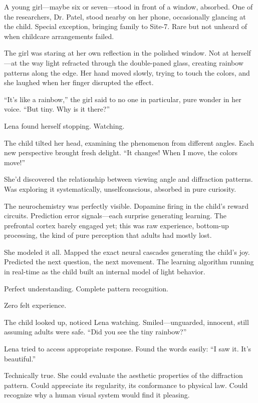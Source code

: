 A young girl—maybe six or seven—stood in front of a window, absorbed. One of the researchers, Dr. Patel, stood nearby on her phone, occasionally glancing at the child. Special exception, bringing family to Site-7. Rare but not unheard of when childcare arrangements failed.

The girl was staring at her own reflection in the polished window. Not at herself—at the way light refracted through the double-paned glass, creating rainbow patterns along the edge. Her hand moved slowly, trying to touch the colors, and she laughed when her finger disrupted the effect.

``It's like a rainbow,'' the girl said to no one in particular, pure wonder in her voice. ``But tiny. Why is it there?''

Lena found herself stopping. Watching.

The child tilted her head, examining the phenomenon from different angles. Each new perspective brought fresh delight. ``It changes! When I move, the colors move!''

She'd discovered the relationship between viewing angle and diffraction patterns. Was exploring it systematically, unselfconscious, absorbed in pure curiosity.

The neurochemistry was perfectly visible. Dopamine firing in the child's reward circuits. Prediction error signals—each surprise generating learning. The prefrontal cortex barely engaged yet; this was raw experience, bottom-up processing, the kind of pure perception that adults had mostly lost.

She modeled it all. Mapped the exact neural cascades generating the child's joy. Predicted the next question, the next movement. The learning algorithm running in real-time as the child built an internal model of light behavior.

Perfect understanding. Complete pattern recognition.

Zero felt experience.

The child looked up, noticed Lena watching. Smiled—unguarded, innocent, still assuming adults were safe. ``Did you see the tiny rainbow?''

Lena tried to access appropriate response. Found the words easily: ``I saw it. It's beautiful.''

Technically true. She could evaluate the aesthetic properties of the diffraction pattern. Could appreciate its regularity, its conformance to physical law. Could recognize why a human visual system would find it pleasing.

